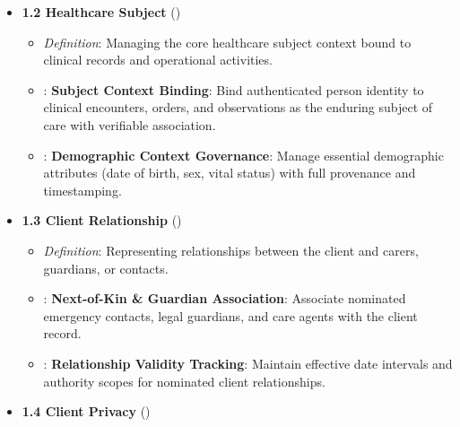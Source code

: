 \begin{itemize}
\begin{itemize}
\end{itemize}


\item 
\textbf{1.2 Healthcare Subject} (\texttt{})


\begin{itemize}

\item 
\emph{Definition}: Managing the core healthcare subject context bound to clinical records and operational activities.



\item 
\texttt{}: \textbf{Subject Context Binding}: Bind authenticated person identity to clinical encounters, orders, and observations as the enduring subject of care with verifiable association.



\item 
\texttt{}: \textbf{Demographic Context Governance}: Manage essential demographic attributes (date of birth, sex, vital status) with full provenance and timestamping.



\end{itemize}


\item 
\textbf{1.3 Client Relationship} (\texttt{})


\begin{itemize}

\item 
\emph{Definition}: Representing relationships between the client and carers, guardians, or contacts.



\item 
\texttt{}: \textbf{Next-of-Kin \& Guardian Association}: Associate nominated emergency contacts, legal guardians, and care agents with the client record.



\item 
\texttt{}: \textbf{Relationship Validity Tracking}: Maintain effective date intervals and authority scopes for nominated client relationships.



\end{itemize}


\item 
\textbf{1.4 Client Privacy} (\texttt{})



\end{itemize}
